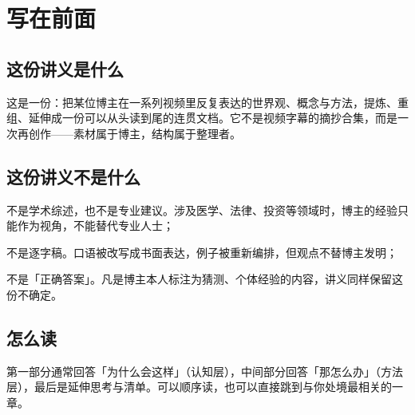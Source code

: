 \section*{写在前面}

\subsection*{这份讲义是什么}

这是一份：把某位博主在一系列视频里反复表达的世界观、概念与方法，提炼、重组、延伸成一份可以从头读到尾的连贯文档。它不是视频字幕的摘抄合集，而是一次再创作——素材属于博主，结构属于整理者。

\subsection*{这份讲义不是什么}

\begin{checklist}
  \item 不是学术综述，也不是专业建议。涉及医学、法律、投资等领域时，博主的经验只能作为视角，不能替代专业人士；
  \item 不是逐字稿。口语被改写成书面表达，例子被重新编排，但观点不替博主发明；
  \item 不是「正确答案」。凡是博主本人标注为猜测、个体经验的内容，讲义同样保留这份不确定。
\end{checklist}

\subsection*{怎么读}

 第一部分通常回答「为什么会这样」（认知层），中间部分回答「那怎么办」（方法层），最后是延伸思考与清单。可以顺序读，也可以直接跳到与你处境最相关的一章。
